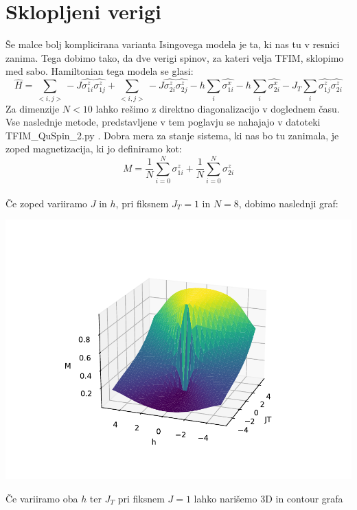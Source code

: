 \documentclass{article}
\begin{document}
\section{Sklopljeni verigi}
Še malce bolj komplicirana varianta Isingovega modela je ta, ki nas tu v resnici zanima. Tega dobimo tako, da dve verigi spinov, za kateri velja TFIM, sklopimo med sabo. Hamiltonian tega modela se glasi:
\begin{equation}
    \hat{H} = \sum_{< i,j >} -J \hat{\sigma_{1i}^z} \hat{\sigma_{1j}^z} + \sum_{< i,j >} -J \hat{\sigma_{2i}^z} \hat{\sigma_{2j}^z} - h\sum_i \hat{\sigma_{1i}^x}- h\sum_i \hat{\sigma_{2i}^x} - J_T \sum_i \hat{\sigma_{1j}^z} \hat{\sigma_{2i}^z}
\end{equation}
Za dimenzije $N < 10$ lahko rešimo z direktno diagonalizacijo v doglednem času. Vse naslednje metode, predstavljene v tem poglavju se nahajajo v datoteki TFIM\_QuSpin\_2.py . Dobra mera za stanje sistema, ki nas bo tu zanimala, je zoped magnetizacija, ki jo definiramo kot:
\begin{equation}
    M = \frac{1}{N}\sum_{i=0}^N \sigma_{1i}^z + \frac{1}{N}\sum_{i=0}^N \sigma_{2i}^z
\end{equation}\\

\noindent Če zoped variiramo $J$ in $h$, pri fiksnem $J_T = 1$ in $N = 8$, dobimo naslednji graf:

\includegraphics[]{TFIM2_3D_J_h_N=8.pdf}

\noindent Če variiramo oba $h$ ter $J_T$ pri fiksnem $J = 1$ lahko narišemo 3D in contour grafa\\\\
\end{document}
